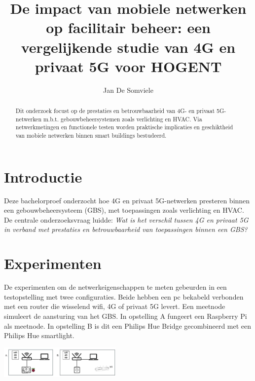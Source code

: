 \documentclass[a0,portrait]{hogent-poster}
\title{De impact van mobiele netwerken op facilitair beheer: een vergelijkende studie van 4G en privaat 5G voor HOGENT}
\author{Jan De Somviele}
\begin{document}
\maketitle

\begin{abstract}
Dit onderzoek focust op de prestaties en betrouwbaarheid van 4G- en privaat 5G-netwerken m.b.t. gebouwbeheersystemen zoals verlichting en HVAC.
Via netwerkmetingen en functionele testen worden praktische implicaties en geschiktheid van mobiele netwerken binnen smart buildings bestudeerd.
\end{abstract}

\begin{multicols}{2} %

\section{Introductie}

Deze bachelorproef onderzocht hoe 4G en privaat 5G-netwerken presteren binnen een gebouwbeheersysteem (GBS), met toepassingen zoals verlichting en HVAC. De centrale onderzoeksvraag luidde: \textit{Wat is het verschil tussen 4G en privaat 5G in verband met prestaties en betrouwbaarheid van toepassingen binnen een GBS?}



\section{Experimenten}
De experimenten om de netwerkeigenschappen te meten gebeurden in een testopstelling met twee configuraties. Beide hebben een pc bekabeld verbonden met een router die wisselend wifi, 4G of privaat 5G levert. Een meetnode simuleert de aansturing van het GBS. In opstelling A fungeert een Raspberry Pi als meetnode. In opstelling B is dit een Philips Hue Bridge gecombineerd met een Philips Hue smartlight.

\begin{center}
    \captionsetup{type=figure}
    \includegraphics[width=0.45\textwidth]{../graphics/beideOpstellingen.jpg}
\end{center}



\end{multicols}
\end{document}
